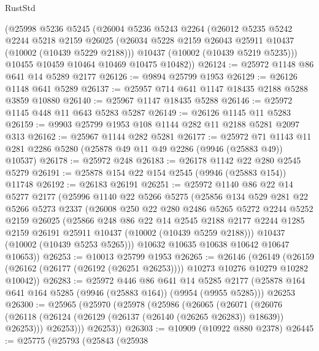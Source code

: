 \begin{lexlean}{RustStd}
\begin{coremodule}
    (@25998
      @5236
      @5245
      (@26004
        @5236
        @5243
        @2264
        (@26012
          @5235
          @5242
          @2244
          @5218
          @2159
          @26025
          (@26034 @5228 @2159 @26043 @25911 @10437 (@10002 (@10439 @5229 @2188)))
          @10437
          (@10002 (@10439 @5219 @5235)))
        @10455
        @10459
        @10464
        @10469
        @10475
        @10482))
@26124 := @25972 @1148 @86 @641 @14 @5289 @2177
@26126 := @9894 @25799 @1953
@26129 := @26126 @1148 @641 @5289
@26137 := @25957 @714 @641 @1147 @18435 @2188 @5288 @3859 @10880
@26140 := @25967 @1147 @18435 @5288
@26146 := @25972 @1145 @448 @11 @643 @5283 @5287
@26149 := @26126 @1145 @11 @5283
@26159 := @9903 @25799 @1953 @108 @1144 @282 @11 @2188 @5281 @2097 @313
@26162 := @25967 @1144 @282 @5281
@26177 := @25972
    @71
    @1143
    @11
    @281
    @2286
    @5280
    (@25878 @49 @11 @49 @2286 (@9946 (@25883 @49)) @10537)
@26178 := @25972 @248
@26183 := @26178 @1142 @22 @280 @2545 @5279
@26191 := @25878 @154 @22 @154 @2545 (@9946 (@25883 @154)) @11748
@26192 := @26183 @26191
@26251 := @25972
    @1140
    @86
    @22
    @14
    @5277
    @2177
    (@25996
      @1140
      @22
      @5266
      @5275
      (@25856
        @134
        @529
        @281
        @22
        @5266
        @5273
        @2337
        (@26008
          @250
          @22
          @280
          @2486
          @5265
          @5272
          @2244
          @5252
          @2159
          @26025
          (@25866
            @248
            @86
            @22
            @14
            @2545
            @2188
            @2177
            @2244
            @1285
            @2159
            @26191
            @25911
            @10437
            (@10002 (@10439 @5259 @2188)))
          @10437
          (@10002 (@10439 @5253 @5265)))
        @10632
        @10635
        @10638
        @10642
        @10647
        @10653))
@26253 := @10013 @25799 @1953
@26265 := @26146
    (@26149 (@26159 (@26162 (@26177 (@26192 (@26251 @26253)))) @10273 @10276 @10279 @10282 @10042))
@26283 := @25972
    @446
    @86
    @641
    @14
    @5285
    @2177
    (@25878 @164 @641 @164 @5285 (@9946 (@25883 @164)) (@9954 (@9955 @5285)))
    @26253
@26300 := @25965
    (@25970
      (@25978
        (@25986
          (@26065
            (@26071
              (@26076 (@26118 (@26124 (@26129 (@26137 (@26140 (@26265 @26283)) @18639)) @26253)))
              @26253)))
        @26253))
@26303 := @10909 (@10922 @880 @2378)
@26445 := @25775
    (@25793
      (@25843
        (@25938

\end{coremodule}
\end{lexlean}
